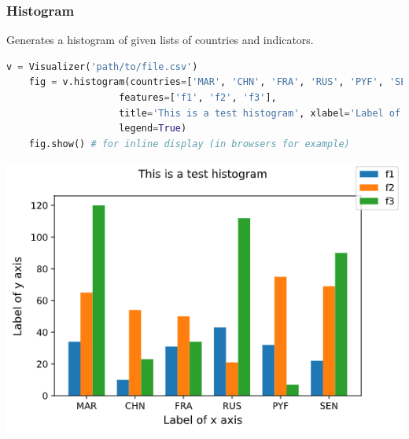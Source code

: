 \begin{frame}[fragile,shrink=30]
  \frametitle{Histogram}
  Generates a histogram of given lists of countries and indicators.
    \begin{lstlisting}[language=Python]
    v = Visualizer('path/to/file.csv')
    fig = v.histogram(countries=['MAR', 'CHN', 'FRA', 'RUS', 'PYF', 'SEN'], 
                    features=['f1', 'f2', 'f3'],
                    title='This is a test histogram', xlabel='Label of x axis', ylabel='Label of y axis', 
                    legend=True)
    fig.show() # for inline display (in browsers for example)
    \end{lstlisting}
    \begin{center}
    \includegraphics[scale=0.6]{beamer/inc/graphics/histogram.png}
    \end{center}
\end{frame}